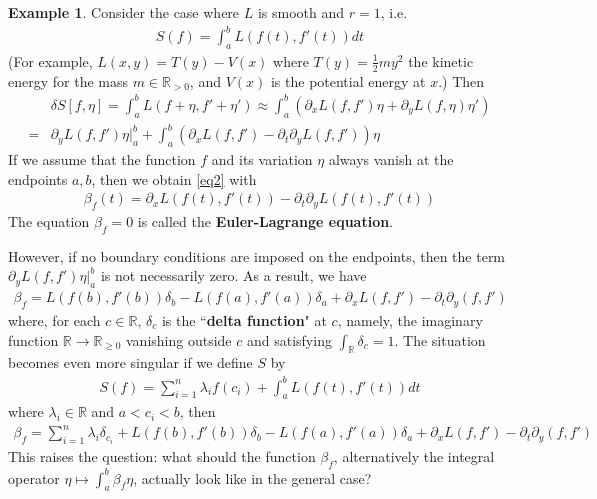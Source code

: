 \documentclass[12pt,b5paper,notitlepage]{article}
\theoremstyle{definition}
\newtheorem{eg}[df]{Example}
\theoremstyle{plain}
\newcommand{\Rbb}{\mathbb R}
\newcommand{\dps}{\displaystyle}
\numberwithin{equation}{section}
\begin{document}
\begin{eg}
Consider the case where $L$ is smooth and $r=1$, i.e.
\begin{align*}
S(f)=\int_a^b L(f(t),f'(t))dt
\end{align*}
(For example, $L(x,y)=T(y)-V(x)$ where $T(y)=\frac 12 my^2$ the kinetic energy for the mass $m\in\Rbb_{>0}$, and $V(x)$ is the potential energy at $x$.) Then
\begin{align*}
&\delta S[f,\eta]=\int_a^b L(f+\eta,f'+\eta')\approx \int_a^b (\partial_x L(f,f')\eta+\partial_y L(f,\eta)\eta')\\
=&\partial_yL(f,f')\eta\big|_a^b+\int_a^b (\partial_xL(f,f')-\partial_t\partial_yL(f,f'))\eta
\end{align*}
If we assume that the function $f$ and its variation $\eta$ always vanish at the endpoints $a,b$, then we obtain \eqref{eq2} with
\begin{align*}
\beta_f(t)=\partial_xL(f(t),f'(t))-\partial_t\partial_yL(f(t),f'(t))
\end{align*}
The equation $\beta_f=0$ is called the \textbf{Euler-Lagrange equation}. 

However, if no boundary conditions are imposed on the endpoints, then the term $\partial_yL(f,f')\eta\big|_a^b$ is not necessarily zero. As a result, we have
\begin{align*}
\beta_f=L(f(b),f'(b))\delta_b-L(f(a),f'(a))\delta_a+\partial_xL(f,f')-\partial_t\partial_y(f,f')
\end{align*}
where, for each $c\in\Rbb$, $\delta_c$ is the ``\textbf{delta function}"  at $c$, namely, the imaginary function $\Rbb\rightarrow\Rbb_{\geq0}$ vanishing outside $c$ and satisfying $\int_\Rbb\delta_c=1$. The situation becomes even more singular if we define $S$ by
\begin{align*}
S(f)=\sum_{i=1}^n \lambda_i f(c_i)+\int_a^b L(f(t),f'(t))dt
\end{align*} 
where $\lambda_i\in\Rbb$ and $a<c_i<b$, then
\begin{align*}
\beta_f=\sum_{i=1}^n \lambda_i\delta_{c_i}+L(f(b),f'(b))\delta_b-L(f(a),f'(a))\delta_a+\partial_xL(f,f')-\partial_t\partial_y(f,f')
\end{align*}
This raises the question: what should the function $\beta_f$, alternatively the integral operator $\dps\eta\mapsto \int_a^b\beta_f\eta$, actually look like in the general case?  \hfill\qedsymbol
\end{eg}
\end{document}
